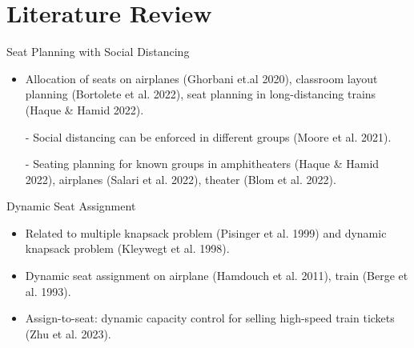 
\section{Literature Review}
    \frame{\sectionpage}
    \begin{frame}{Seat Planning with Social Distancing}
      \begin{itemize}
        \item Allocation of seats on airplanes (Ghorbani et.al 2020), classroom layout planning (Bortolete et al. 2022), seat planning in long-distancing trains (Haque \& Hamid 2022).
        \vspace*{0.5cm}

        \item[-] Social distancing can be enforced in different groups (Moore et al. 2021).
        \vspace*{0.5cm}

        \item[-] Seating planning for known groups in amphitheaters (Haque \& Hamid 2022), airplanes (Salari et al. 2022), theater (Blom et al. 2022).
      \end{itemize}
      \end{frame}
      
      \begin{frame}{Dynamic Seat Assignment}
        \begin{itemize}
          \item Related to multiple knapsack problem (Pisinger et al. 1999) and dynamic knapsack problem (Kleywegt et al. 1998).
          \vspace*{0.5cm}
          \item Dynamic seat assignment on airplane (Hamdouch et al. 2011), train (Berge et al. 1993).
          \vspace*{0.5cm}
          \item Assign-to-seat: dynamic capacity control for selling high-speed train tickets (Zhu et al. 2023).
        \end{itemize}
      \end{frame}